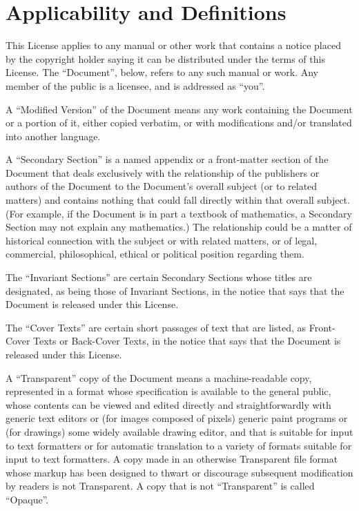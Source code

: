 \documentclass{report}
\begin{document}
\section{Applicability and Definitions}

This License applies to any manual or other work that contains a
notice placed by the copyright holder saying it can be distributed
under the terms of this License.  The ``Document'', below, refers to any
such manual or work.  Any member of the public is a licensee, and is
addressed as ``you''.

A ``Modified Version'' of the Document means any work containing the
Document or a portion of it, either copied verbatim, or with
modifications and/or translated into another language.

A ``Secondary Section'' is a named appendix or a front-matter section of
the Document that deals exclusively with the relationship of the
publishers or authors of the Document to the Document's overall subject
(or to related matters) and contains nothing that could fall directly
within that overall subject.  (For example, if the Document is in part a
textbook of mathematics, a Secondary Section may not explain any
mathematics.)  The relationship could be a matter of historical
connection with the subject or with related matters, or of legal,
commercial, philosophical, ethical or political position regarding
them.

The ``Invariant Sections'' are certain Secondary Sections whose titles
are designated, as being those of Invariant Sections, in the notice
that says that the Document is released under this License.

The ``Cover Texts'' are certain short passages of text that are listed,
as Front-Cover Texts or Back-Cover Texts, in the notice that says that
the Document is released under this License.

A ``Transparent'' copy of the Document means a machine-readable copy,
represented in a format whose specification is available to the
general public, whose contents can be viewed and edited directly and
straightforwardly with generic text editors or (for images composed of
pixels) generic paint programs or (for drawings) some widely available
drawing editor, and that is suitable for input to text formatters or
for automatic translation to a variety of formats suitable for input
to text formatters.  A copy made in an otherwise Transparent file
format whose markup has been designed to thwart or discourage
subsequent modification by readers is not Transparent.  A copy that is
not ``Transparent'' is called ``Opaque''.
\end{document}
